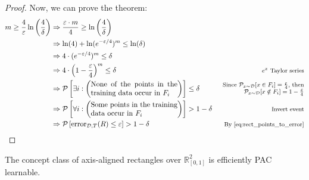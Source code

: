 \begin{theorem}
\begin{proof}
        Now, we can prove the theorem:
        \[
            \begin{aligned}
                m \geq \frac{4}{\varepsilon} \ln \left( \frac{4}{\delta} \right) &\Rightarrow
                    \frac{\varepsilon \cdot m}{4} \geq \ln \left( \frac{4}{\delta} \right) \\
                    & \Rightarrow \ln(4) + \ln(e^{-\varepsilon / 4})^m \leq \ln(\delta) \\
                    & \Rightarrow 4 \cdot (e^{-\varepsilon / 4})^m \leq \delta \\
                    & \Rightarrow 4 \cdot \left( 1 -\frac{\varepsilon}{4} \right)^m \leq \delta 
                        & \text{\footnotesize $e^x$ Taylor series} \\
                    & \Rightarrow \mathcal{P} \left[\exists i: \left( \parbox{4.2cm}{None of the points in the training data occur in $F_i$} \right)\right] \leq \delta 
                        & \parbox{4.1cm}{\raggedleft\footnotesize Since $\mathcal{P}_{x \sim \mathcal{D}}[x \in F_i] = \frac{\varepsilon}{4}$, then $\mathcal{P}_{x \sim \mathcal{D}}[x \notin F_i] = 1-\frac{\varepsilon}{4}$} \\
                    & \Rightarrow \mathcal{P} \left[\forall i: \left( \parbox{4.2cm}{Some points in the training data occur in $F_i$} \right)\right] > 1 - \delta 
                        & \text{\footnotesize Invert event} \\
                    & \Rightarrow \mathcal{P} \left[ \text{error}_{\mathcal{D}, T}(R) \leq \varepsilon \right] > 1 - \delta 
                        & \text{\footnotesize By \Cref{eq:rect_points_to_error}} 
            \end{aligned}  
        \]
    \end{proof}
\end{theorem}


\begin{corollary}
    The concept class of axis-aligned rectangles over $\mathbb{R}^2_{[0, 1]}$ is efficiently PAC learnable.
\end{corollary}